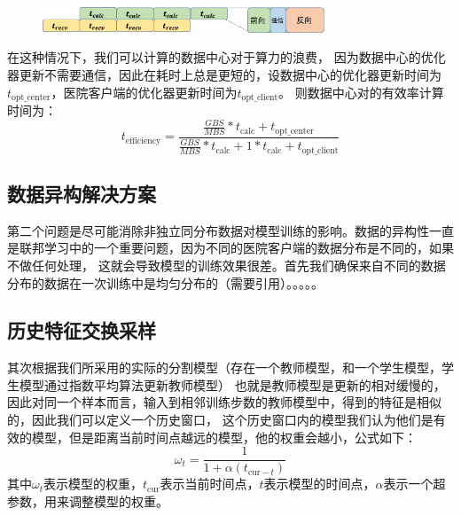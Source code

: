 \begin{figure}
    \centering
    \includegraphics[width=0.75\textwidth]{figures/medfed_efficiency.png}
    \label{fig:diagram}
\end{figure}


在这种情况下，我们可以计算的数据中心对于算力的浪费，
因为数据中心的优化器更新不需要通信，因此在耗时上总是更短的，设数据中心的优化器更新时间为$t_{\text{opt\_center}}$，医院客户端的优化器更新时间为$t_{\text{opt\_client}}$。
则数据中心对的有效率计算时间为：
\begin{equation}
    t_\text{efficiency} = \frac{\frac{GBS}{MBS} * t_{\text{calc}} + t_\text{opt\_center}}{\frac{GBS}{MBS} * t_{\text{calc}} + 1 * t_{\text{calc}} + t_{\text{opt\_client}}}
\end{equation}



\subsection{数据异构解决方案}
第二个问题是尽可能消除非独立同分布数据对模型训练的影响。数据的异构性一直是联邦学习中的一个重要问题\supercite{DBLP:journals/corr/abs-2106-06843}，因为不同的医院客户端的数据分布是不同的，如果不做任何处理，
这就会导致模型的训练效果很差。首先我们确保来自不同的数据分布的数据在一次训练中是均匀分布的（需要引用）。。。。。

\subsection{历史特征交换采样}
其次根据我们所采用的实际的分割模型（存在一个教师模型，和一个学生模型，学生模型通过指数平均算法更新教师模型\supercite{DBLP:journals/corr/TarvainenV17}）
也就是教师模型是更新的相对缓慢的，因此对同一个样本而言，输入到相邻训练步数的教师模型中，得到的特征是相似的，因此我们可以定义一个历史窗口，
这个历史窗口内的模型我们认为他们是有效的模型，但是距离当前时间点越远的模型，他的权重会越小，公式如下：
\begin{equation}
    \omega_{t} = \frac{1}{1 + \alpha(t_{\text{cur} - t})}
\end{equation}
其中$\omega_{t}$表示模型的权重，$t_{\text{cur}}$表示当前时间点，$t$表示模型的时间点，$\alpha$表示一个超参数，用来调整模型的权重。



